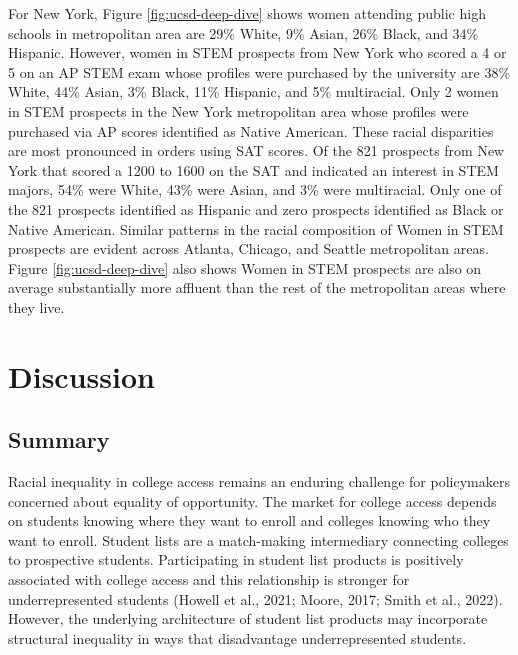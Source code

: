 \documentclass[
  12pt,
]{article}
\begin{document}
For New York, Figure \ref{fig:ucsd-deep-dive} shows women attending public high schools in metropolitan area are 29\% White, 9\% Asian, 26\% Black, and 34\% Hispanic. However, women in STEM prospects from New York who scored a 4 or 5 on an AP STEM exam whose profiles were purchased by the university are 38\% White, 44\% Asian, 3\% Black, 11\% Hispanic, and 5\% multiracial. Only 2 women in STEM prospects in the New York metropolitan area whose profiles were purchased via AP scores identified as Native American. These racial disparities are most pronounced in orders using SAT scores. Of the 821 prospects from New York that scored a 1200 to 1600 on the SAT and indicated an interest in STEM majors, 54\% were White, 43\% were Asian, and 3\% were multiracial. Only one of the 821 prospects identified as Hispanic and zero prospects identified as Black or Native American. Similar patterns in the racial composition of Women in STEM prospects are evident across Atlanta, Chicago, and Seattle metropolitan areas. Figure \ref{fig:ucsd-deep-dive} also shows Women in STEM prospects are also on average substantially more affluent than the rest of the metropolitan areas where they live.

\hypertarget{discussion}{%
\section{Discussion}\label{discussion}}

\hypertarget{summary}{%
\subsection{Summary}\label{summary}}

Racial inequality in college access remains an enduring challenge for policymakers concerned about equality of opportunity. The market for college access depends on students knowing where they want to enroll and colleges knowing who they want to enroll. Student lists are a match-making intermediary connecting colleges to prospective students. Participating in student list products is positively associated with college access and this relationship is stronger for underrepresented students (Howell et al., 2021; Moore, 2017; Smith et al., 2022). However, the underlying architecture of student list products may incorporate structural inequality in ways that disadvantage underrepresented students.
\end{document}
